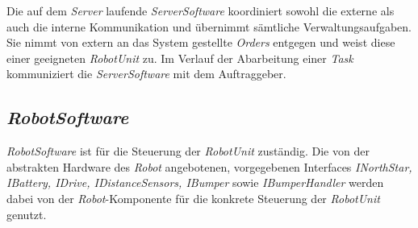 Die auf dem \emph{Server} laufende \emph{ServerSoftware} koordiniert sowohl die externe als auch die interne Kommunikation und übernimmt sämtliche Verwaltungsaufgaben. Sie nimmt von extern an das System gestellte \emph{Orders} entgegen und weist diese einer geeigneten \emph{RobotUnit} zu. Im Verlauf der Abarbeitung einer \emph{Task} kommuniziert die \emph{ServerSoftware} mit dem Auftraggeber.

\subsection{\textit{RobotSoftware}}

\emph{RobotSoftware} ist für die Steuerung der \textit{RobotUnit} zuständig. 
Die von der abstrakten Hardware des \textit{Robot} angebotenen, vorgegebenen Interfaces \textit{INorthStar, IBattery, IDrive, IDistanceSensors, IBumper} sowie
\textit{IBumperHandler} werden dabei von der \textit{Robot}-Komponente für die konkrete Steuerung der \textit{RobotUnit} genutzt.
